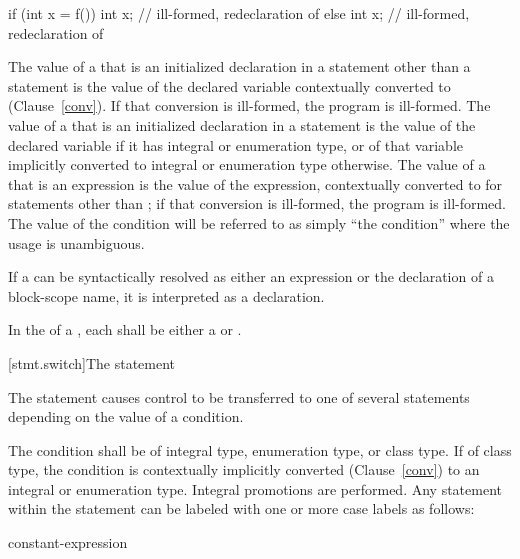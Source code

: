 \documentclass[ebook,10pt,oneside,openany,final]{memoir}
\begin{document}
\begin{codeblock}
if (int x = f()) {
  int x;            // ill-formed, redeclaration of 
}
else {
  int x;            // ill-formed, redeclaration of 
}
\end{codeblock}
\exitexample

\pnum
The value of a  that is an initialized declaration
in a statement other than a  statement is the value of the
declared variable
contextually converted to  (Clause~\ref{conv}).
If that
conversion is ill-formed, the program is ill-formed. The value of a
 that is an initialized declaration in a
 statement is the value of the declared variable if it has
integral or enumeration type, or of that variable implicitly converted
to integral or enumeration type otherwise. The value of a
 that is an expression is the value of the
expression, contextually converted to 
for statements other
than ;
if that conversion is ill-formed, the program is
ill-formed. The value of the condition will be referred to as simply
``the condition'' where the usage is unambiguous.

\pnum
If a  can be syntactically resolved as either an
expression or the declaration of a block-scope name, it is interpreted as a
declaration.

\pnum
In the  of a , each
 shall be either a 
or .

[stmt.switch]{The  statement}%

\pnum
The  statement causes control to be transferred to one of
several statements depending on the value of a condition.

\pnum
The condition shall be of integral type, enumeration type, or class
type. If of class type, the
condition is contextually implicitly converted (Clause~\ref{conv}) to
an integral or enumeration type. Integral promotions are performed. Any
statement within the  statement can be labeled with one or
more case labels as follows:

\begin{ncbnf}
%
 constant-expression \terminal{:}
\end{ncbnf}
\end{document}
